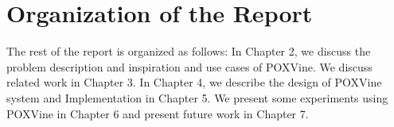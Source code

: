 \section{Organization of the Report}
The rest of the report is organized as follows: In Chapter 2, we discuss the problem description and inspiration and use cases of POXVine. We discuss related work in Chapter 3. In Chapter 4, we describe the design of POXVine system and Implementation in Chapter 5. We present some experiments using POXVine in Chapter 6 and present future work in Chapter 7.  



